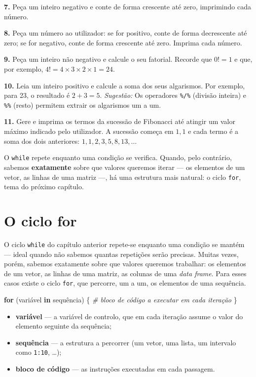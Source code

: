 \documentclass[
  portuguese,
  11pt,
  openany]{book}
\newenvironment{Shaded}{\begin{snugshade}}{\end{snugshade}}
\newcommand{\CommentTok}[1]{\textcolor[rgb]{0.56,0.35,0.01}{\textit{#1}}}
\newcommand{\ControlFlowTok}[1]{\textcolor[rgb]{0.13,0.29,0.53}{\textbf{#1}}}
\newcommand{\NormalTok}[1]{#1}
\providecommand{\tightlist}{%
  \setlength{\itemsep}{0pt}\setlength{\parskip}{0pt}}
\begin{document}
\textbf{7.} Peça um inteiro negativo e conte de forma crescente até zero, imprimindo cada
número.

\textbf{8.} Peça um número ao utilizador: se for positivo, conte de forma decrescente até
zero; se for negativo, conte de forma crescente até zero. Imprima cada número.

\textbf{9.} Peça um inteiro não negativo e calcule o seu fatorial. Recorde que \(0! = 1\) e
que, por exemplo, \(4! = 4 \times 3 \times 2 \times 1 = 24\).

\textbf{10.} Leia um inteiro positivo e calcule a soma dos seus algarismos. Por exemplo,
para 23, o resultado é \(2 + 3 = 5\).
\emph{Sugestão:} Os operadores \texttt{\%/\%} (divisão inteira) e \texttt{\%\%} (resto) permitem extrair os algarismos um a um.

\textbf{11.} Gere e imprima os termos da sucessão de Fibonacci até atingir um valor
máximo indicado pelo utilizador. A sucessão começa em \(1, 1\) e cada termo é a soma
dos dois anteriores: \(1, 1, 2, 3, 5, 8, 13, \ldots\)

O \texttt{while} repete enquanto uma condição se verifica. Quando, pelo contrário, sabemos
\textbf{exatamente} sobre que valores queremos iterar --- os elementos de um vetor, as
linhas de uma matriz ---, há uma estrutura mais natural: o ciclo \texttt{for}, tema do próximo
capítulo.

\chapter{O ciclo for}\label{for}

O ciclo \texttt{while} do capítulo anterior repete-se enquanto uma condição se mantém --- ideal
quando não sabemos quantas repetições serão precisas. Muitas vezes, porém, sabemos
exatamente sobre que valores queremos trabalhar: os elementos de um vetor, as linhas
de uma matriz, as colunas de uma \emph{data frame}. Para esses casos existe o ciclo \texttt{for},
que percorre, um a um, os elementos de uma sequência.

\begin{Shaded}
\begin{Highlighting}[]
\ControlFlowTok{for}\NormalTok{ (variável }\ControlFlowTok{in}\NormalTok{ sequência) \{}
  \CommentTok{\# bloco de código a executar em cada iteração}
\NormalTok{\}}
\end{Highlighting}
\end{Shaded}

\begin{itemize}
\tightlist
\item
  \textbf{variável} --- a variável de controlo, que em cada iteração assume o valor do
  elemento seguinte da sequência;
\item
  \textbf{sequência} --- a estrutura a percorrer (um vetor, uma lista, um intervalo como
  \texttt{1:10}, \ldots);
\item
  \textbf{bloco de código} --- as instruções executadas em cada passagem.
\end{itemize}
\end{document}

